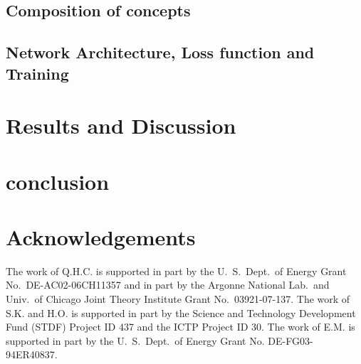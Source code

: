 \documentclass{JMLFS}
\begin{document}
\subsection{Composition of concepts}
\subsection{Network Architecture, Loss function and Training}

\section{Results and Discussion}\label{results_and_discussion}
\section{conclusion}\label{conclusion}
\section*{Acknowledgements}
The work of Q.H.C. is supported in part by the U.~S.~Dept.~of Energy
Grant No.~DE-AC02-06CH11357 and in part
by the Argonne National Lab.~and Univ.~of Chicago Joint Theory Institute
Grant No.~03921-07-137.
The work of S.K. and H.O. is supported in part by the Science and Technology
Development Fund (STDF) Project ID 437 and the ICTP Project ID 30.
The work of E.M. is supported in part by the U.~S.~Dept.~of Energy
Grant No. DE-FG03-94ER40837.
\end{document}
